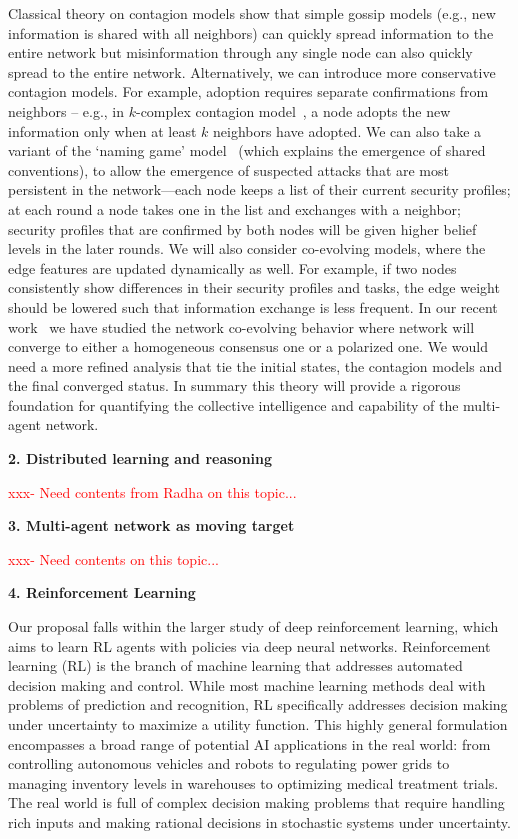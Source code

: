 \documentclass{NSF}
\begin{document}
Classical theory on contagion models show that simple gossip models (e.g., new information is shared with all neighbors) can quickly spread information to the entire network but misinformation through any single node can also quickly spread to the entire network.
Alternatively, we can introduce more conservative contagion models.
For example, adoption requires separate confirmations from neighbors -- e.g., in $k$-complex contagion model~\cite{Ghasemiesfeh:2013:CCW,ebrahimi17complex,gao16general}, a node adopts the new information only when at least $k$ neighbors have adopted.
We can also take a variant of the `naming game' model~\cite{gao2017engineering} (which explains the emergence of shared conventions), to allow the emergence of suspected attacks that are most persistent in the network---each node keeps a list of their current security profiles; at each round a node takes one in the list and exchanges with a neighbor; security profiles that are confirmed by both nodes will be given higher belief levels in the later rounds.
We will also consider co-evolving models, where the edge features are updated dynamically as well.
For example, if two nodes consistently show differences in their security profiles and tasks, the edge weight should be lowered such that information exchange is less frequent.
In our recent work~\cite{wang22coevolution} we have studied the network co-evolving behavior where network will converge to either a homogeneous consensus one or a polarized one.
We would need a more refined analysis that tie the initial states, the contagion models and the final converged status.
In summary this theory will provide a rigorous foundation for quantifying the collective intelligence and capability of the multi-agent network.


\noindent \textbf{2. Distributed learning and reasoning}

\textcolor{red}{xxx- Need contents from Radha on this topic...}


\noindent \textbf{3. Multi-agent network as moving target}

\textcolor{red}{xxx- Need contents on this topic...}



\noindent \textbf{4. Reinforcement Learning}

Our proposal falls within the larger study of deep reinforcement learning, which aims to learn RL agents with policies via deep neural networks.
Reinforcement learning (RL) is the branch of machine learning that addresses automated decision making and control.
While most machine learning methods deal with problems of prediction and recognition, RL specifically addresses decision making under uncertainty to maximize a utility function.
This highly general formulation encompasses a broad range of potential AI applications in the real world: from controlling autonomous vehicles and robots to regulating power grids to managing inventory levels in warehouses to optimizing medical treatment trials.
The real world is full of complex decision making problems that require handling rich inputs and making rational decisions in stochastic systems under uncertainty.
\end{document}

